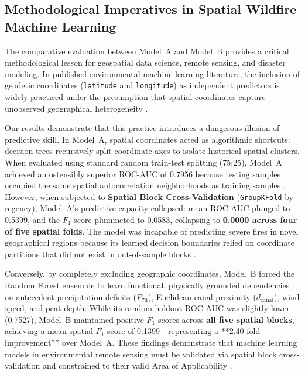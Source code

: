 \subsection{Methodological Imperatives in Spatial Wildfire Machine Learning}
\label{subsec:disc_spatial_ml}

The comparative evaluation between Model~A and Model~B provides a critical methodological lesson for geospatial data science, remote sensing, and disaster modeling. In published environmental machine learning literature, the inclusion of geodetic coordinates (\texttt{latitude} and \texttt{longitude}) as independent predictors is widely practiced under the presumption that spatial coordinates capture unobserved geographical heterogeneity \citep{Meyer2018EcolModel, Dormann2007Ecography}.

Our results demonstrate that this practice introduces a dangerous illusion of predictive skill. In Model~A, spatial coordinates acted as algorithmic shortcuts: decision trees recursively split coordinate axes to isolate historical spatial clusters. When evaluated using standard random train-test splitting (75:25), Model~A achieved an ostensibly superior ROC-AUC of 0.7956 because testing samples occupied the same spatial autocorrelation neighborhoods as training samples \citep{Tobler1970EconGeogr, Legendre1993Ecology}. However, when subjected to \textbf{Spatial Block Cross-Validation} (\texttt{GroupKFold} by regency), Model~A's predictive capacity collapsed: mean ROC-AUC plunged to 0.5399, and the $F_1$-score plummeted to 0.0583, collapsing to \textbf{0.0000 across four of five spatial folds}. The model was incapable of predicting severe fires in novel geographical regions because its learned decision boundaries relied on coordinate partitions that did not exist in out-of-sample blocks \citep{Roberts2017Ecography, Wadoux2021EcolModel}.

Conversely, by completely excluding geographic coordinates, Model~B forced the Random Forest ensemble to learn functional, physically grounded dependencies on antecedent precipitation deficits ($P_{\text{7d}}$), Euclidean canal proximity ($d_{\text{canal}}$), wind speed, and peat depth. While its random holdout ROC-AUC was slightly lower (0.7527), Model~B maintained positive $F_1$-scores across \textbf{all five spatial blocks}, achieving a mean spatial $F_1$-score of 0.1399---representing a **2.40-fold improvement** over Model~A. These findings demonstrate that machine learning models in environmental remote sensing must be validated via spatial block cross-validation and constrained to their valid Area of Applicability \citep{MeyerPebesma2021NatComm, Schratz2019EcolModel}.


